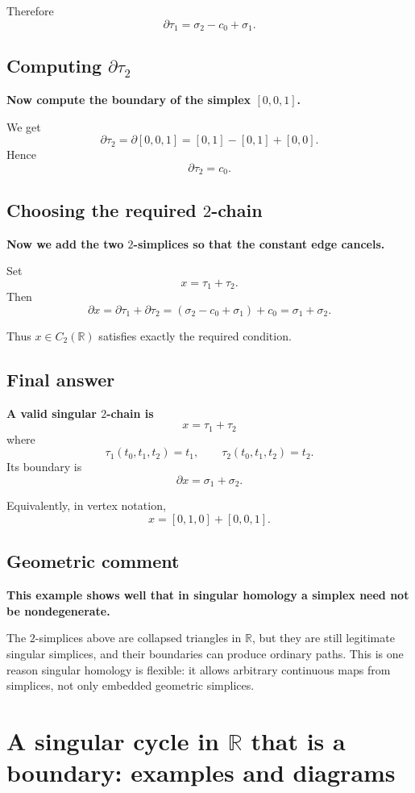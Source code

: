 \documentclass[12pt,a4paper]{article}
\theoremstyle{notespace}
\begin{document}
Therefore
\[
\partial\tau_1=\sigma_2-c_0+\sigma_1.
\]

\subsection{Computing \(\partial \tau_2\)}

\textbf{Now compute the boundary of the simplex \([0,0,1]\).}

We get
\[
\partial\tau_2
=
\partial[0,0,1]
=
[0,1]-[0,1]+[0,0].
\]
Hence
\[
\partial\tau_2=c_0.
\]

\subsection{Choosing the required \(2\)-chain}

\textbf{Now we add the two \(2\)-simplices so that the constant edge cancels.}

Set
\[
x=\tau_1+\tau_2.
\]
Then
\[
\partial x
=
\partial\tau_1+\partial\tau_2
=
(\sigma_2-c_0+\sigma_1)+c_0
=
\sigma_1+\sigma_2.
\]

Thus \(x\in C_2(\mathbb{R})\) satisfies exactly the required condition.

\subsection{Final answer}

\textbf{A valid singular \(2\)-chain is}
\[
\boxed{x=\tau_1+\tau_2}
\]
where
\[
\tau_1(t_0,t_1,t_2)=t_1,
\qquad
\tau_2(t_0,t_1,t_2)=t_2.
\]
Its boundary is
\[
\boxed{\partial x=\sigma_1+\sigma_2.}
\]

Equivalently, in vertex notation,
\[
\boxed{x=[0,1,0]+[0,0,1].}
\]

\subsection{Geometric comment}

\textbf{This example shows well that in singular homology a simplex need not be nondegenerate.}

The \(2\)-simplices above are collapsed triangles in \(\mathbb{R}\), but they are still legitimate singular simplices, and their boundaries can produce ordinary paths. This is one reason singular homology is flexible: it allows arbitrary continuous maps from simplices, not only embedded geometric simplices.

\section{A singular cycle in \(\mathbb{R}\) that is a boundary: examples and diagrams}
\end{document}
